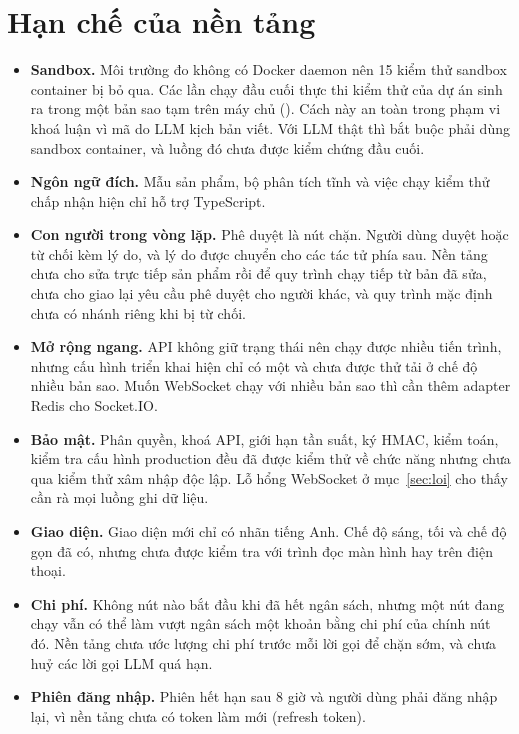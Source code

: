 \section{Hạn chế của nền tảng}

\begin{itemize}
\item \textbf{Sandbox.} Môi trường đo không có Docker daemon nên 15 kiểm thử sandbox container bị bỏ qua. Các lần chạy đầu cuối thực thi kiểm thử của dự án sinh ra trong một bản sao tạm trên máy chủ (). Cách này an toàn trong phạm vi khoá luận vì mã do LLM kịch bản viết. Với LLM thật thì bắt buộc phải dùng sandbox container, và luồng đó chưa được kiểm chứng đầu cuối.
\item \textbf{Ngôn ngữ đích.} Mẫu sản phẩm, bộ phân tích tĩnh và việc chạy kiểm thử chấp nhận hiện chỉ hỗ trợ TypeScript.
\item \textbf{Con người trong vòng lặp.} Phê duyệt là nút chặn. Người dùng duyệt hoặc từ chối kèm lý do, và lý do được chuyển cho các tác tử phía sau. Nền tảng chưa cho sửa trực tiếp sản phẩm rồi để quy trình chạy tiếp từ bản đã sửa, chưa cho giao lại yêu cầu phê duyệt cho người khác, và quy trình mặc định chưa có nhánh riêng khi bị từ chối.
\item \textbf{Mở rộng ngang.} API không giữ trạng thái nên chạy được nhiều tiến trình, nhưng cấu hình triển khai hiện chỉ có một và chưa được thử tải ở chế độ nhiều bản sao. Muốn WebSocket chạy với nhiều bản sao thì cần thêm adapter Redis cho Socket.IO.
\item \textbf{Bảo mật.} Phân quyền, khoá API, giới hạn tần suất, ký HMAC, kiểm toán, kiểm tra cấu hình production đều đã được kiểm thử về chức năng nhưng chưa qua kiểm thử xâm nhập độc lập. Lỗ hổng WebSocket ở mục~\ref{sec:loi} cho thấy cần rà mọi luồng ghi dữ liệu.
\item \textbf{Giao diện.} Giao diện mới chỉ có nhãn tiếng Anh. Chế độ sáng, tối và chế độ gọn đã có, nhưng chưa được kiểm tra với trình đọc màn hình hay trên điện thoại.
\item \textbf{Chi phí.} Không nút nào bắt đầu khi đã hết ngân sách, nhưng một nút đang chạy vẫn có thể làm vượt ngân sách một khoản bằng chi phí của chính nút đó. Nền tảng chưa ước lượng chi phí trước mỗi lời gọi để chặn sớm, và chưa huỷ các lời gọi LLM quá hạn.
\item \textbf{Phiên đăng nhập.} Phiên hết hạn sau 8 giờ và người dùng phải đăng nhập lại, vì nền tảng chưa có token làm mới (refresh token).
\end{itemize}
